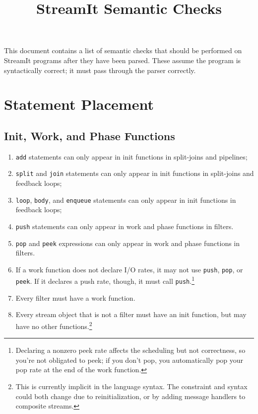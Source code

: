 \documentclass[11pt]{article}
\title{StreamIt Semantic Checks}
\begin{document}
\maketitle

This document contains a list of semantic checks that should be
performed on StreamIt programs after they have been parsed.  These
assume the program is syntactically correct; it must pass through the
parser correctly.

\section{Statement Placement}

\subsection{Init, Work, and Phase Functions}

\begin{enumerate}
\item \lstinline|add| statements can only appear in init functions in
  split-joins and pipelines;
\item \lstinline|split| and \lstinline|join| statements can only
  appear in init functions in split-joins and feedback loops;
\item \lstinline|loop|, \lstinline|body|, and \lstinline|enqueue|
  statements can only appear in init functions in feedback loops;
\item \lstinline|push| statements can only appear in work and phase
  functions in filters.
\item \lstinline|pop| and \lstinline|peek| expressions can only appear
  in work and phase functions in filters.
\item If a work function does not declare I/O rates, it may not use
  \lstinline|push|, \lstinline|pop|, or \lstinline|peek|.  If it
  declares a push rate, though, it must call
  \lstinline|push|.\footnote{Declaring a nonzero peek rate affects the
    scheduling but not correctness, so you're not obligated to peek;
    if you don't pop, you automatically pop your pop rate at the end
    of the work function.}
\item Every filter must have a work function.
\item Every stream object that is not a filter must have an init
  function, but may have no other functions.\footnote{This is
    currently implicit in the language syntax.  The constraint and
    syntax could both change due to reinitialization, or by adding
    message handlers to composite streams.}
\end{enumerate}
\end{document}
